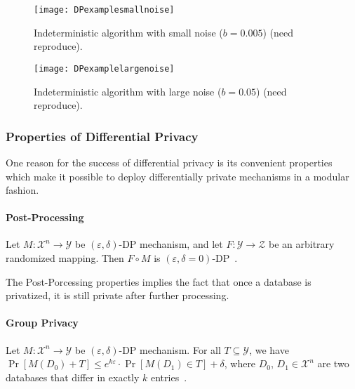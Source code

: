 \begin{figure}[htbp]
    \texttt{[image: DPexamplesmallnoise]}
    \centering
    \caption{Indeterministic algorithm with small noise ($b=0.005$) (need reproduce).}
    \label{img:DPexamplesmallnoise}
\end{figure}
\FloatBarrier

\begin{figure}[htbp]
    \texttt{[image: DPexamplelargenoise]}
    \centering
    \caption{Indeterministic algorithm with large noise ($b=0.05$) (need reproduce).}
    \label{img:DPexamplelargenoise}
\end{figure}
\FloatBarrier

\subsubsection{Properties of Differential Privacy}
One reason for the success of differential privacy is its convenient properties which make it possible to deploy differentially private mechanisms in a modular fashion.

\paragraph{Post-Processing}
\begin{theorem} Let $M:\mathcal{X}^{n} \rightarrow \mathcal{Y}$ be $\left( \varepsilon ,\delta \right)$-DP mechanism, and let $F:\mathcal{Y}\rightarrow \mathcal{Z}$  be an arbitrary randomized mapping. Then $F\circ M$ is $\left( \varepsilon ,\delta=0 \right)$-DP~\cite{dwork2014algorithmic}.
\end{theorem}
The Post-Porcessing properties implies the fact that once a database is privatized, it is still private after further processing.

\paragraph{Group Privacy}
\begin{theorem} Let $M:\mathcal{X}^{n} \rightarrow \mathcal{Y}$ be $\left( \varepsilon ,\delta \right)$-DP mechanism. For all $T\subseteq \mathcal{Y}$, we have $\Pr \left[ M\left(D_{0}\right) +T\right] \leq e^{k \varepsilon}\cdot \Pr \left[ M\left( D_{1}\right) \in T\right] +\delta$, where $D_{0}$, $D_{1}\in \mathcal{X}^{n}$ are two databases that differ in exactly $k$ entries~\cite{dwork2014algorithmic}.
\end{theorem}

